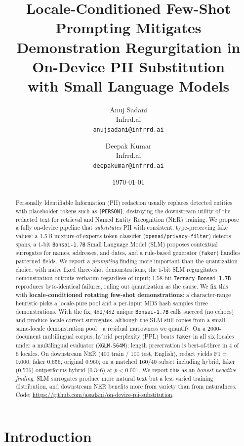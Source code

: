 \documentclass[11pt]{article}
\title{Locale-Conditioned Few-Shot Prompting Mitigates\\
       Demonstration Regurgitation in On-Device PII Substitution\\
       with Small Language Models}
\author{
  Anuj Sadani\\
  Infrrd.ai\\
  \texttt{anujsadani@infrrd.ai}
  \and
  Deepak Kumar\\
  Infrrd.ai\\
  \texttt{deepakumar@infrrd.ai}
}
\date{\today}
\newcommand{\code}[1]{\texttt{#1}}
\newcommand{\openaipf}{\code{openai/privacy-filter}}
\newcommand{\bonsai}{\code{Bonsai-1.7B}}
\newcommand{\ternary}{\code{Ternary-Bonsai-1.7B}}
\newcommand{\faker}{\code{faker}}
\newcommand{\xglm}{\code{XGLM-564M}}
\begin{document}
\maketitle

\begin{abstract}
Personally Identifiable Information (PII) redaction usually replaces
detected entities with placeholder tokens such as \code{[PERSON]},
destroying the downstream utility of the redacted text for retrieval
and Named Entity Recognition (NER) training. We propose a fully
on-device pipeline that \emph{substitutes} PII with consistent,
type-preserving fake values: a 1.5\,B mixture-of-experts token
classifier (\openaipf{}) detects spans, a 1-bit \bonsai{} Small
Language Model (SLM) proposes contextual surrogates for names,
addresses, and dates, and a rule-based generator (\faker{}) handles
patterned fields. We report a \emph{prompting} finding more important
than the quantization choice: with naive fixed three-shot
demonstrations, the 1-bit SLM regurgitates demonstration outputs
verbatim regardless of input; 1.58-bit \ternary{} reproduces
byte-identical failures, ruling out quantization as the cause. We fix
this with \textbf{locale-conditioned rotating few-shot demonstrations}:
a character-range heuristic picks a locale-pure pool and a per-input
MD5 hash samples three demonstrations. With the fix, 482/482 unique \bonsai{} calls succeed
(no echoes) and produce locale-correct surrogates, although the SLM
still copies from a small same-locale demonstration pool---a residual
narrowness we quantify. On a 2000-document
multilingual corpus, hybrid perplexity (PPL) beats \faker{} in all six
locales under a multilingual evaluator (\xglm{}); length preservation
is best-of-three in 4 of 6 locales. On downstream NER (400 train / 100
test, English), redact yields F1$=$0.000, faker 0.656, original 0.960;
on a matched 160/40 subset including hybrid, faker (0.506) outperforms
hybrid (0.346) at $p<0.001$. We report this as an \emph{honest
negative finding}: SLM surrogates produce more natural text but a less
varied training distribution, and downstream NER benefits more from
variety than from naturalness. Code:
\url{https://github.com/asadani/on-device-pii-substitution}.
\end{abstract}

\section{Introduction}
\label{sec:intro}
\end{document}
